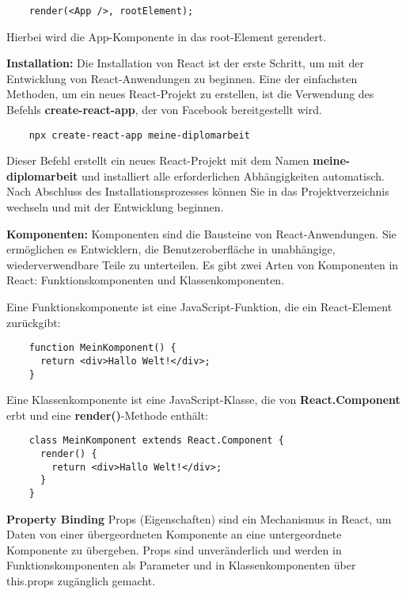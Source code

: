 \begin{lstlisting}
    render(<App />, rootElement);
\end{lstlisting}

Hierbei wird die App-Komponente in das root-Element gerendert.

\textbf{Installation:}
\newline
Die Installation von React ist der erste Schritt, um mit der Entwicklung von React-Anwendungen zu beginnen. Eine der einfachsten Methoden, um ein neues React-Projekt zu erstellen, ist die Verwendung des Befehls \textbf{create-react-app}, der von Facebook bereitgestellt wird.

\begin{lstlisting}
    npx create-react-app meine-diplomarbeit
\end{lstlisting}

Dieser Befehl erstellt ein neues React-Projekt mit dem Namen \textbf{meine-diplomarbeit} und installiert alle erforderlichen Abhängigkeiten automatisch. Nach Abschluss des Installationsprozesses können Sie in das Projektverzeichnis wechseln und mit der Entwicklung beginnen.

\cite{frontend_web_react_installation}

\textbf{Komponenten:}
\newline
Komponenten sind die Bausteine von React-Anwendungen. Sie ermöglichen es Entwicklern, die Benutzeroberfläche in unabhängige, wiederverwendbare Teile zu unterteilen. Es gibt zwei Arten von Komponenten in React: Funktionskomponenten und Klassenkomponenten.

Eine Funktionskomponente ist eine JavaScript-Funktion, die ein React-Element zurückgibt:

\begin{lstlisting}
    function MeinKomponent() {
      return <div>Hallo Welt!</div>;
    }
\end{lstlisting}

Eine Klassenkomponente ist eine JavaScript-Klasse, die von \textbf{React.Component} erbt und eine \textbf{render()}-Methode enthält:

\begin{lstlisting}
    class MeinKomponent extends React.Component {
      render() {
        return <div>Hallo Welt!</div>;
      }
    }
\end{lstlisting}

\cite{frontend_web_react_components}

\textbf{Property Binding}
\newline
Props (Eigenschaften) sind ein Mechanismus in React, um Daten von einer übergeordneten Komponente an eine untergeordnete Komponente zu übergeben. Props sind unveränderlich und werden in Funktionskomponenten als Parameter und in Klassenkomponenten über this.props zugänglich gemacht.

